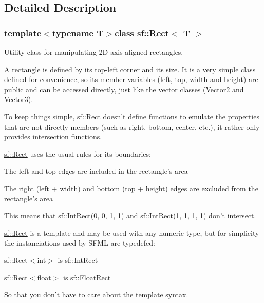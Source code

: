 \subsection{Detailed Description}
\subsubsection*{template$<$typename T$>$class sf\-::\-Rect$<$ T $>$}

Utility class for manipulating 2\-D axis aligned rectangles. 

A rectangle is defined by its top-\/left corner and its size. It is a very simple class defined for convenience, so its member variables (left, top, width and height) are public and can be accessed directly, just like the vector classes (\hyperlink{classsf_1_1_vector2}{Vector2} and \hyperlink{classsf_1_1_vector3}{Vector3}).

To keep things simple, \hyperlink{classsf_1_1_rect}{sf\-::\-Rect} doesn't define functions to emulate the properties that are not directly members (such as right, bottom, center, etc.), it rather only provides intersection functions.

\hyperlink{classsf_1_1_rect}{sf\-::\-Rect} uses the usual rules for its boundaries\-: \begin{DoxyItemize}
\item The left and top edges are included in the rectangle's area \item The right (left + width) and bottom (top + height) edges are excluded from the rectangle's area\end{DoxyItemize}
This means that sf\-::\-Int\-Rect(0, 0, 1, 1) and sf\-::\-Int\-Rect(1, 1, 1, 1) don't intersect.

\hyperlink{classsf_1_1_rect}{sf\-::\-Rect} is a template and may be used with any numeric type, but for simplicity the instanciations used by S\-F\-M\-L are typedefed\-: \begin{DoxyItemize}
\item sf\-::\-Rect$<$int$>$ is \hyperlink{namespacesf_aae67411782674934f78d55fa3af18403}{sf\-::\-Int\-Rect} \item sf\-::\-Rect$<$float$>$ is \hyperlink{namespacesf_aed4e58f586b2eed2621c0365d0b7554e}{sf\-::\-Float\-Rect}\end{DoxyItemize}
So that you don't have to care about the template syntax.

